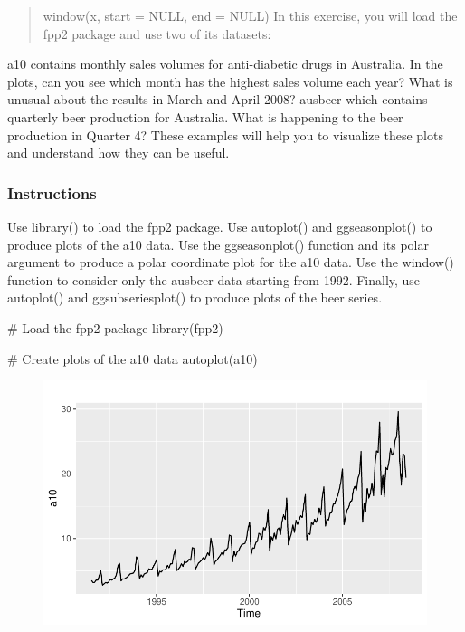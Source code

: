 \documentclass[
  letterpaper,
  DIV=11,
  numbers=noendperiod]{scrartcl}
\newenvironment{Shaded}{\begin{snugshade}}{\end{snugshade}}
\newcommand{\CommentTok}[1]{\textcolor[rgb]{0.37,0.37,0.37}{#1}}
\newcommand{\FunctionTok}[1]{\textcolor[rgb]{0.28,0.35,0.67}{#1}}
\newcommand{\NormalTok}[1]{\textcolor[rgb]{0.00,0.23,0.31}{#1}}
\begin{document}
\begin{quote}
window(x, start = NULL, end = NULL) In this exercise, you will load the
fpp2 package and use two of its datasets:
\end{quote}

a10 contains monthly sales volumes for anti-diabetic drugs in Australia.
In the plots, can you see which month has the highest sales volume each
year? What is unusual about the results in March and April 2008? ausbeer
which contains quarterly beer production for Australia. What is
happening to the beer production in Quarter 4? These examples will help
you to visualize these plots and understand how they can be useful.

\hypertarget{instructions}{%
\subsubsection{Instructions}\label{instructions}}

Use library() to load the fpp2 package. Use autoplot() and
ggseasonplot() to produce plots of the a10 data. Use the ggseasonplot()
function and its polar argument to produce a polar coordinate plot for
the a10 data. Use the window() function to consider only the ausbeer
data starting from 1992. Finally, use autoplot() and ggsubseriesplot()
to produce plots of the beer series.

\begin{Shaded}
\begin{Highlighting}[]
\CommentTok{\# Load the fpp2 package}
\FunctionTok{library}\NormalTok{(fpp2)}

\CommentTok{\# Create plots of the a10 data}
\FunctionTok{autoplot}\NormalTok{(a10)}
\end{Highlighting}
\end{Shaded}

\begin{figure}[H]

{\centering \includegraphics{forecasting_datacamp_ex_files/figure-pdf/unnamed-chunk-3-1.pdf}

}

\end{figure}
\end{document}
